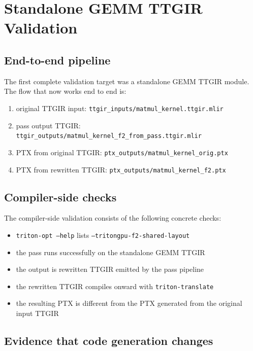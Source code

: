\documentclass[11pt,a4paper]{article}
\begin{document}
\section{Standalone GEMM TTGIR Validation}

\subsection{End-to-end pipeline}

The first complete validation target was a standalone GEMM TTGIR module.  The
flow that now works end to end is:

\begin{enumerate}
\item original TTGIR input:
      \texttt{ttgir\_inputs/matmul\_kernel.ttgir.mlir}
\item pass output TTGIR:
      \texttt{ttgir\_outputs/matmul\_kernel\_f2\_from\_pass.ttgir.mlir}
\item PTX from original TTGIR:
      \texttt{ptx\_outputs/matmul\_kernel\_orig.ptx}
\item PTX from rewritten TTGIR:
      \texttt{ptx\_outputs/matmul\_kernel\_f2.ptx}
\end{enumerate}

\subsection{Compiler-side checks}

The compiler-side validation consists of the following concrete checks:

\begin{itemize}
\item \texttt{triton-opt --help} lists
      \texttt{--tritongpu-f2-shared-layout}
\item the pass runs successfully on the standalone GEMM TTGIR
\item the output is rewritten TTGIR emitted by the pass pipeline
\item the rewritten TTGIR compiles onward with \texttt{triton-translate}
\item the resulting PTX is different from the PTX generated from the original
      input TTGIR
\end{itemize}

\subsection{Evidence that code generation changes}
\end{document}
